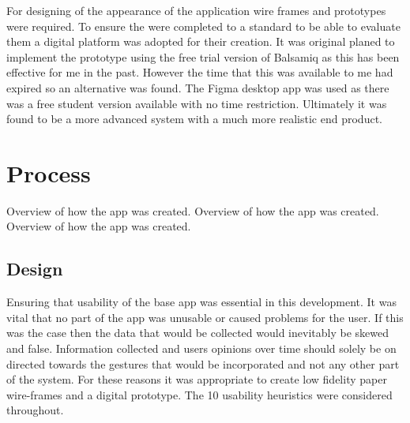 \documentclass{l4proj}
\begin{document}
For designing of the appearance of the application wire frames and prototypes were required. To ensure the were completed to a standard to be able to evaluate them a digital platform was adopted for their creation. It was original planed to implement the prototype using the free trial version of Balsamiq as this has been effective for me in the past. However the time that this was available to me had expired so an alternative was found. The Figma desktop app was used as there was a free student version available with no time restriction. Ultimately it was found to be a more advanced system with a much more realistic end product.


\section{Process}
Overview of how the app was created. Overview of how the app was created. Overview of how the app was created.





\subsection{Design}
Ensuring that usability of the base app was essential in this development. It was vital that no part of the app was unusable or caused problems for the user. If this was the case then the data that would be collected would inevitably be skewed and false. Information collected and users opinions over time should solely be on directed towards the gestures that would be incorporated and not any other part of the system. For these reasons it was appropriate to create low fidelity paper wire-frames and a digital prototype. The 10 usability heuristics were considered throughout.
\end{document}

